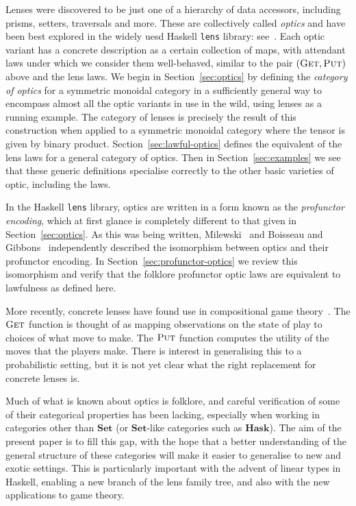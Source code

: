 \documentclass[11pt,letterpaper]{article}
\theoremstyle{plain}
\theoremstyle{definition}
\newcommand{\lenslib}{\texttt{lens}}
\newcommand{\Set}{\mathbf{Set}}
\newcommand{\fget}{\textsc{Get}}
\newcommand{\fput}{\textsc{Put}}
\begin{document}
Lenses were discovered to be just one of a hierarchy of data accessors, including prisms, setters, traversals and more. These are collectively called \emph{optics} and have been best explored in the widely uesd Haskell \lenslib{} library: see~\cite{LensLibrary}. Each optic variant has a concrete description as a certain collection of maps, with attendant laws under which we consider them well-behaved, similar to the pair $(\fget, \fput)$ above and the lens laws. We begin in Section~\ref{sec:optics} by defining the \emph{category of optics} for a symmetric monoidal category in a sufficiently general way to encompass almost all the optic variants in use in the wild, using lenses as a running example. The category of lenses is precisely the result of this construction when applied to a symmetric monoidal category where the tensor is given by binary product. Section~\ref{sec:lawful-optics} defines the equivalent of the lens laws for a general category of optics. Then in Section~\ref{sec:examples} we see that these generic definitions specialise correctly to the other basic varieties of optic, including the laws. %

In the Haskell \lenslib{} library, optics are written in a form known as the \emph{profunctor encoding}, which at first glance is completely different to that given in Section~\ref{sec:optics}. As this was being written, Milewski~\cite{ProfunctorOpticsPost} and Boisseau and Gibbons~\cite{YouNeeda} independently described the isomorphism between optics and their profunctor encoding. In Section~\ref{sec:profunctor-optics} we review this isomorphism and verify that the folklore profunctor optic laws are equivalent to lawfulness as defined here.

More recently, concrete lenses have found use in compositional game theory~\cite{CompositionalGameTheory}. The $\fget$ function is thought of as mapping observations on the state of play to choices of what move to make. The $\fput$ function computes the utility of the moves that the players make. There is interest in generalising this to a probabilistic setting, but it is not yet clear what the right replacement for concrete lenses is.

Much of what is known about optics is folklore, and careful verification of some of their categorical properties has been lacking, especially when working in categories other than $\Set$ (or $\Set$-like categories such as $\mathbf{Hask}$). The aim of the present paper is to fill this gap, with the hope that a better understanding of the general structure of these categories will make it easier to generalise to new and exotic settings. This is particularly important with the advent of linear types in Haskell, enabling a new branch of the lens family tree, and also with the new applications to game theory.
\end{document}
